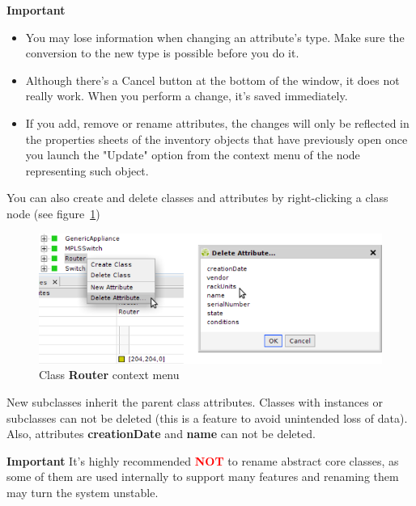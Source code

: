 \documentclass[a4paper]{article}
\begin{document}
			
			\begin{framed} {\large \textbf{Important}}
				\begin{itemize}
					\item You may lose information when changing an attribute's type. Make sure the conversion to the new type is possible before you do it.
					\item Although there's a Cancel button at the bottom of the window, it does not	really work. When you perform a change, it's saved immediately.
					\item If you add, remove or rename attributes, the changes will only be reflected in the properties sheets of the inventory objects that have previously open once you launch the "Update" option from the context menu of the node representing such object.
				\end{itemize}
			\end{framed}
			You can also create and delete classes and attributes by right-clicking a class node (see figure~\ref{fig:class_node_menu})
			\begin{figure}[h!]
				\centering
				\includegraphics[width=0.7\linewidth]{img/class_node_menu.png}
				\caption{Class \textbf{Router} context menu}
				\label{fig:class_node_menu}
			\end{figure}
			New subclasses inherit the parent class attributes. Classes with instances or subclasses can not be deleted (this is  a  feature to avoid unintended loss of data). Also, attributes \textbf{creationDate} and \textbf{name} can not be deleted.
			\begin{framed} {\large \textbf{Important}}
				It's highly recommended \textbf{\textcolor{red}{NOT}} to rename abstract core classes, as some of them are used internally to support many features and renaming them may turn the system unstable.
			\end{framed}
\end{document}
